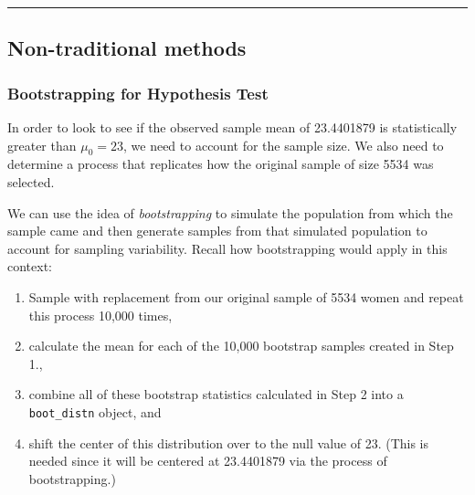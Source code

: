 \documentclass[]{tufte-book}
\let\oldrule=\rule
\renewcommand{\rule}[1]{\oldrule{\linewidth}}
\providecommand{\tightlist}{%
  \setlength{\itemsep}{0pt}\setlength{\parskip}{0pt}}
\begin{document}
\begin{center}\rule{0.5\linewidth}{\linethickness}\end{center}

\subsection{Non-traditional methods}\label{non-traditional-methods}

\subsubsection{Bootstrapping for Hypothesis
Test}\label{bootstrapping-for-hypothesis-test}

In order to look to see if the observed sample mean of 23.4401879 is
statistically greater than \(\mu_0 = 23\), we need to account for the
sample size. We also need to determine a process that replicates how the
original sample of size 5534 was selected.

We can use the idea of \emph{bootstrapping} to simulate the population
from which the sample came and then generate samples from that simulated
population to account for sampling variability. Recall how bootstrapping
would apply in this context:

\begin{enumerate}
\def\labelenumi{\arabic{enumi}.}
\tightlist
\item
  Sample with replacement from our original sample of 5534 women and
  repeat this process 10,000 times,
\item
  calculate the mean for each of the 10,000 bootstrap samples created in
  Step 1.,
\item
  combine all of these bootstrap statistics calculated in Step 2 into a
  \texttt{boot\_distn} object, and
\item
  shift the center of this distribution over to the null value of 23.
  (This is needed since it will be centered at 23.4401879 via the
  process of bootstrapping.)
\end{enumerate}
\end{document}
